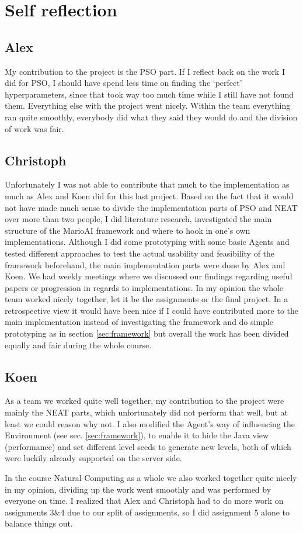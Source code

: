 \documentclass[]{article}
\begin{document}
\section{Self reflection}
\subsection{Alex}
My contribution to the project is the PSO part. If I reflect back on the work I did for PSO, I should have spend less time on finding the `perfect' hyperparameters, since that took way too much time while I still have not found them. Everything else with the project went nicely. Within the team everything ran quite smoothly, everybody did what they said they would do and the division of work was fair.

\subsection{Christoph}

Unfortunately I was not able to contribute that much to the implementation as much as Alex and Koen did for this last project. Based on the fact that it would not have made much sense to divide the implementation parts of PSO and NEAT over more than two people, I did literature research, investigated the main structure of the MarioAI framework and where to hook in one's own implementations. Although I did some prototyping with some basic Agents and tested different approaches to test the actual usability and feasibility of the framework beforehand, the main implementation parts were done by Alex and Koen.  We had weekly meetings where we discussed our findings regarding useful papers or progression in regards to implementations. In my opinion the whole team worked nicely together, let it be the assignments or the final project. In a retrospective view it would have been nice if I could have contributed more to the main implementation instead of investigating the framework and do simple prototyping as in section \ref{sec:framework} but overall the work has been divided equally and fair during the whole course. 


\subsection{Koen}
As a team we worked quite well together, my contribution to the project were mainly the NEAT parts, which unfortunately did not perform that well, but at least we could reason why not. I also modified the Agent's way of influencing the Environment (see sec. \ref{sec:framework}), to enable it to hide the Java view (performance) and set different level seeds to generate new levels, both of which were luckily already supported on the server side. \medskip

In the course Natural Computing as a whole we also worked together quite nicely in my opinion, dividing up the work went smoothly and was performed by everyone on time. I realized that Alex and Christoph had to do more work on assignments 3\&4 due to our split of assignments, so I did assignment 5 alone to balance things out.


\end{document}
